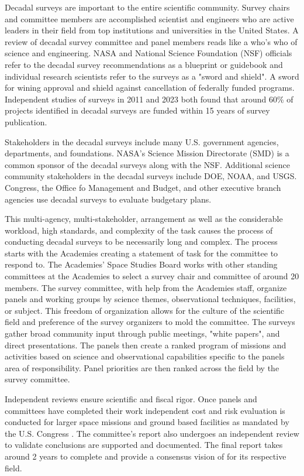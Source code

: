 \documentclass[preprint,12pt]{elsarticle}
\begin{document}
Decadal surveys are important to the entire scientific community. Survey chairs and committee members are accomplished scientist and engineers who are active leaders in their field from top institutions and universities in the United States. A review of decadal survey committee and panel members reads like a who's who of science and engineering. NASA and National Science Foundation (NSF) officials refer to the decadal survey recommendations as a blueprint or guidebook and individual research scientists refer to the surveys as a "sword and shield". A sword for wining approval and shield against cancellation of federally funded programs. Independent studies of surveys in 2011 \cite{Trimble2011} and 2023 \cite{pan2023seven_decadals} both found that around 60\% of projects identified in decadal surveys are funded within 15 years of survey publication. 

Stakeholders in the decadal surveys include many U.S. government agencies, departments, and foundations. NASA's Science Mission Directorate (SMD) is a common sponsor of the decadal surveys along with the NSF. Additional science community stakeholders in the decadal surveys include DOE, NOAA, and USGS. Congress, the Office fo Management and Budget, and other executive branch agencies use decadal surveys to evaluate budgetary plans.

This multi-agency, multi-stakeholder, arrangement as well as the considerable workload, high standards, and complexity of the task causes the process of conducting decadal surveys to be necessarily long and complex. The process starts with the Academies creating a statement of task for the committee to respond to. The Academies' Space Studies Board works with other standing committees at the Academies to select a survey chair and committee of around 20 members. The survey committee, with help from the Academies staff, organize panels and working groups by science themes, observational techniques, facilities, or subject. This freedom of organization allows for the culture of the scientific field and preference of the survey organizers to mold the committee. The surveys gather broad community input through public meetings, "white papers", and direct presentations. The panels then create a ranked program of missions and activities based on science and observational capabilities specific to the panels area of responsibility. Panel priorities are then ranked across the field by the survey committee. 

Independent reviews ensure scientific and fiscal rigor. Once panels and committees have completed their work independent cost and risk evaluation is conducted for larger space missions and ground based facilities as mandated by the U.S. Congress \cite{congress2008NASA}. The committee's report also undergoes an independent review to validate conclusions are supported and documented. The final report takes around 2 years to complete and provide a consensus vision of for its respective field.
\end{document}
